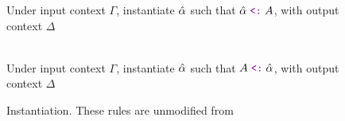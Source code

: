 \begin{figure*}[ht]
  \begin{subfigure}
    {Under input context $\Gamma$,
      instantiate $\hat{\alpha}$ such that $\ahat \subtype A$, 
      with output context $\Delta$}
%
\\[-1.5ex]
%
    {Under input context $\Gamma$,
      instantiate $\hat{\alpha}$ such that $A \subtype \ahat$,
      with output context $\Delta$}
 \small{}

\caption{Instantiation. These rules are unmodified from \cite{completebidir}}
  \end{subfigure}

\end{figure*}
